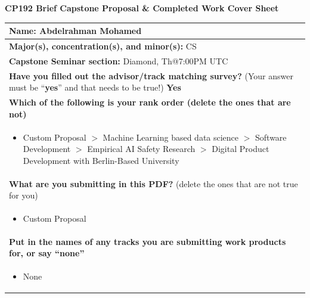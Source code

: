 \documentclass[11pt]{article}
\begin{document}

\begin{center}
{\Large \textbf{CP192 Brief Capstone Proposal \& Completed Work Cover Sheet}}
\end{center}

\vspace{0.5em}

\begin{tabularx}{\textwidth}{|X|}
\hline
\textbf{Name:} Abdelrahman Mohamed \\
\hline
\textbf{Major(s), concentration(s), and minor(s):} CS \\
\hline
\textbf{Capstone Seminar section:} Diamond, Th@7:00PM UTC \\
\hline
\textbf{Have you filled out the advisor/track matching survey?} (Your answer must be ``\textbf{yes}'' and that needs to be true!) \textbf{Yes} \\
\hline
\textbf{Which of the following is your rank order (delete the ones that are not)} \\
\begin{itemize}[leftmargin=1.4em, itemsep=0pt, topsep=0.2em]
  \item Custom Proposal $>$ Machine Learning based data science $>$ Software Development $>$ Empirical AI Safety Research $>$ Digital Product Development with Berlin-Based University
\end{itemize}
\\[-0.8em]
\hline
\textbf{What are you submitting in this PDF?} (delete the ones that are not true for you) \\
\begin{itemize}[leftmargin=1.4em, itemsep=0pt, topsep=0.2em]
  \item Custom Proposal
\end{itemize}
\\[-0.8em]
\hline
\textbf{Put in the names of any tracks you are submitting work products for, or say ``none''} \\
\begin{itemize}[leftmargin=1.4em, itemsep=0pt, topsep=0.2em]
  \item None
\end{itemize}
\\[-0.8em]
\hline
\end{tabularx}

\newpage

\end{document}
